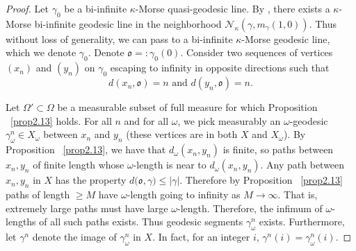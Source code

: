 \documentclass[12 pt]{amsart}
\newcommand{\calN}{\mathcal{N}}
\newcommand{\gothic}{\mathfrak}
\newcommand{\go}{{\gothic o}}
\theoremstyle{definition}
\theoremstyle{remark}
\begin{document}
\begin{proof}
Let $\gamma_0$ be a bi-infinite $\kappa$-Morse quasi-geodesic line. By \cite[Lemma 4.2 (1)]{QRT2}, there exists a $\kappa$-Morse bi-infinite geodesic line in the neighborhood $\calN_\kappa( \gamma,m_\gamma(1,0))$. Thus without loss of generality, we can pass to a bi-infinite $\kappa$-Morse geodesic line, which we denote $\gamma_0$. Denote $\go=:\gamma_{0}(0)$. Consider two sequences of vertices $(x_{n})$ and $(y_{n})$ on $\gamma_{0}$ escaping to infinity in opposite directions such that 
\[d(x_n, \go) = n \text{ and } d(y_n, \go) = n.\]

Let $\Omega' \subset \Omega$ be a measurable subset of full measure for which Proposition ~\ref{prop2.13} holds. For all $n$ and for all $\omega$, we pick measurably an $\omega$-geodesic $\gamma_{\omega}^{n} \in X_{\omega}$ between $x_{n}$ and $y_{n}$ (these vertices are in both $X$ and $X_\omega$). 
By Proposition ~\ref{prop2.13}, we have that $d_{\omega}\left(x_{n}, y_{n}\right)$ is finite, so paths between $x_n, y_n$ of finite length whose $\omega$-length is near to $d_\omega(x_n,y_n)$. Any path between $x_n, y_n$ in $X$ has the property $d(\mathfrak{o, \gamma)\leq |\gamma|}$. Therefore by Proposition ~\ref{prop2.13} paths of length $\geq M$ have $\omega$-length going to infinity as $M \rightarrow \infty$. That is, extremely large paths must have large $\omega$-length. Therefore, the infimum of $\omega$-lengths of all such paths exists. Thus geodesic segments $\gamma_{\omega}^{n}$ exists. Furthermore,  let $\gamma^n$ denote the image of $\gamma_{\omega}^{n}$ in $X$. In fact, for an integer $i$, $\gamma^n(i)=\gamma_{\omega}^{n}(i).$

\end{proof}
\end{document}
